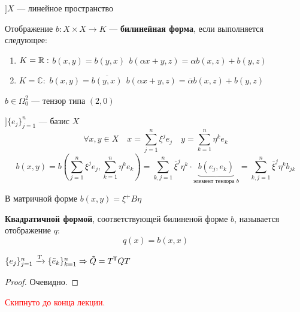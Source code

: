 $] X$ --- линейное пространство

\begin{definition}
    Отображение $b : X\times X \to K$ --- \textbf{билинейная форма}, если выполняется следующее:
    \begin{enumerate}
        \item $K=\mathbb{R}:$ $b(x, y) = b(y, x) \ \ b(\alpha x + y, z) = \alpha b(x, z) + b(y, z)$
        \item $K=\mathbb{C}:$ $b(x, y) = \overline{b(y, x)} \ \ b(\alpha x + y, z) = \overline\alpha b(x, z) + b(y, z)$
    \end{enumerate}
\end{definition}
\begin{remark}
    $b\in \Omega_0^2$ --- тензор типа $(2, 0)$
\end{remark}

$] \{e_j\}_{j=1}^n$ --- базис $X$
$$\forall x,y\in X \quad x=\sum_{j=1}^n \xi^j e_j \quad y = \sum_{k=1}^n \eta^k e_k$$
$$b(x, y) = b(\sum_{j=1}^n \xi^j e_j, \sum_{k=1}^n \eta^k e_k)=\sum_{k,j=1}^n \overline \xi^j \eta^k \cdot \underbrace{b(e_j, e_k)}_{\text{элемент тензора }b}=\sum_{k,j=1}^n \overline \xi^j \eta^k b_{jk}$$

\begin{remark}
    В матричной форме $b(x,y) = \xi^+ B \eta$
\end{remark}

\begin{definition}
    \textbf{Квадратичной формой}, соответствующей билиненой форме $b$, называется отображение $q$:
    $$q(x)=b(x, x)$$
\end{definition}

\begin{lemma}
    $\{e_j\}_{j=1}^n \xrightarrow{T} \{\tilde e_k\}_{k=1}^n \Rightarrow \tilde Q = T^{\mkern-1.5mu\mathsf{T}} Q T$
\end{lemma}
\begin{proof}
    Очевидно.
\end{proof}

\textcolor{red}{Скипнуто до конца лекции.}


